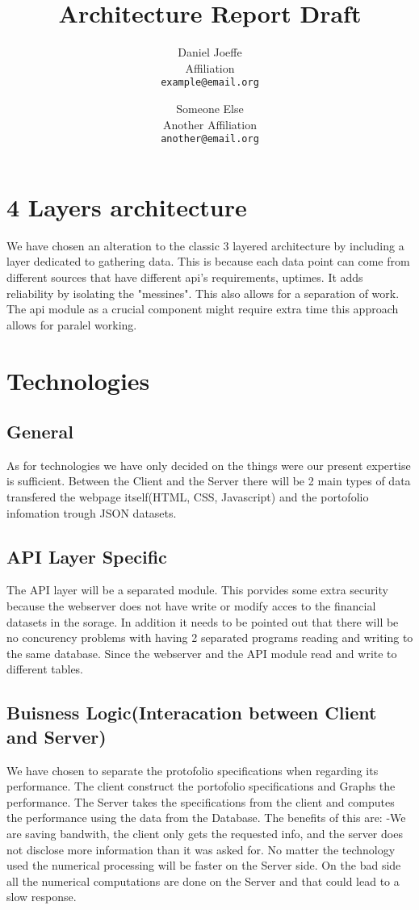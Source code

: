 \documentclass[a4paper,11pt]{article}
\title{Architecture Report Draft}
\date{}
\author{Daniel Joeffe\\
       Affiliation\\
       \texttt{example@email.org}
  \and Someone Else\\
       Another Affiliation\\
       \texttt{another@email.org}
}
\begin{document}
\maketitle

\section{4 Layers architecture}
	We have chosen an alteration to the classic 3 layered architecture by including a layer dedicated to gathering data. This is because each data point can come from different sources that have different api's requirements, uptimes. It adds reliability by isolating the  "messines". This also allows for a separation of work. The api module as a crucial component might require extra time this approach allows for paralel working. 
	



\section{Technologies}
\subsection{General}
As for technologies we have only decided on the things were our present expertise is sufficient. Between the Client and the Server there will be 2 main types of data transfered the webpage itself(HTML, CSS, Javascript) and the portofolio infomation trough JSON datasets. 
\subsection{API Layer Specific}
The API layer will be a separated module. This porvides some extra security because the webserver does not have write or modify acces to the financial datasets in the sorage. In addition it needs to be pointed out that there will be no concurency problems with having 2 separated programs reading and writing to the same database. Since the webserver and the API module read and write to different tables.
\subsection{Buisness Logic(Interacation between Client and Server)}
We have chosen to separate the protofolio specifications when regarding its performance. The client construct the portofolio specifications and Graphs the performance. The Server takes the specifications from the client and computes the performance using the data from the Database. The benefits of this are: -We are saving bandwith, the client only gets the requested info, and the server does not disclose more information than it was asked for. No matter the technology used the numerical processing will be faster on the Server side. On the bad side all the numerical computations are done on the Server and that could lead to a slow response. 
\end{document}
